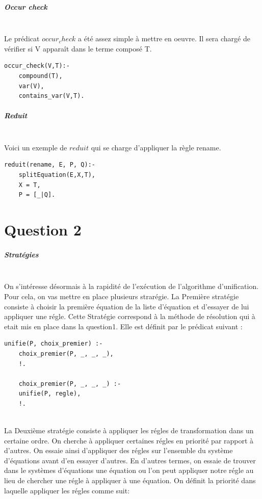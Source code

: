 \documentclass[10pt,a4paper]{report}
\begin{document}
\paragraph{Occur check} ~\\
Le prédicat $occur_check$ a été assez simple à mettre en oeuvre. Il sera chargé de vérifier si V apparaît dans le terme composé T.
\begin{lstlisting}[caption ={Dans le fichier $main.pl$}]
occur_check(V,T):-
	compound(T),
	var(V),
	contains_var(V,T).
\end{lstlisting}

\paragraph{Reduit} ~\\
Voici un exemple de $reduit$ qui se charge d'appliquer la règle rename.
\begin{lstlisting}[caption ={reduit dans $main.pl$}]
reduit(rename, E, P, Q):-
	splitEquation(E,X,T),
	X = T,
	P = [_|Q].
\end{lstlisting}





\chapter*{Question 2}
\paragraph{Stratégies} ~\\
On s'intéresse désormais à la rapidité de l'exécution de l'algorithme d'unification.
Pour cela, on vas mettre en place plusieurs strarégie.
\newline
La Première stratégie consiste à choisir la première équation de la liste d'équation et d'essayer de lui appliquer une régle. Cette Stratégie correspond à la méthode de résolution qui à etait mis en place dans la question1. Elle est définit par le prédicat suivant :
\begin{lstlisting}[caption ={Stratégie choix premier dans $main.pl$}]
% unification choix premier
unifie(P, choix_premier) :- 
	choix_premier(P, _, _, _),
	!.
	
	choix_premier(P, _, _, _) :- 
	unifie(P, regle),
	!.
\end{lstlisting} ~\\

La Deuxième stratégie consiste à appliquer les régles de transformation dans un certaine ordre. On cherche à appliquer certaines régles en priorité par rapport à d'autres. On essaie ainsi d'appliquer des régles sur l'ensemble du système d'équations avant d'en essayer d'autres. En d'autres termes, on essaie de trouver dans le systèmes d'équations une équation ou l'on peut appliquer notre régle au lieu de chercher une régle à appliquer à une équation.
\newline
On définit la priorité dans laquelle appliquer les régles comme suit:
\end{document}
